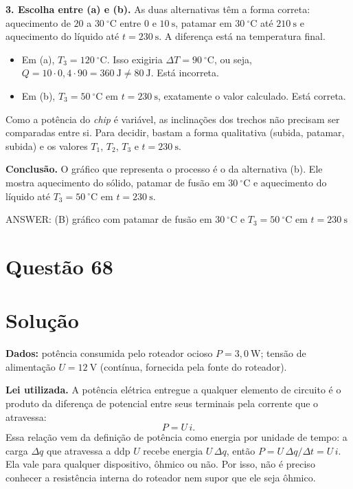 \documentclass{article}%
\begin{document}
\textbf{3. Escolha entre (a) e (b).} As duas alternativas têm a forma correta: aquecimento de $20$ a $30\ ^\circ\mathrm{C}$ entre $0$ e $10\ \mathrm{s}$, patamar em $30\ ^\circ\mathrm{C}$ até $210\ \mathrm{s}$ e aquecimento do líquido até $t = 230\ \mathrm{s}$. A diferença está na temperatura final.
\begin{itemize}
\item Em (a), $T_3 = 120\ ^\circ\mathrm{C}$. Isso exigiria $\Delta T = 90\ ^\circ\mathrm{C}$, ou seja, $Q = 10\cdot 0{,}4\cdot 90 = 360\ \mathrm{J} \neq 80\ \mathrm{J}$. Está incorreta.
\item Em (b), $T_3 = 50\ ^\circ\mathrm{C}$ em $t = 230\ \mathrm{s}$, exatamente o valor calculado. Está correta.
\end{itemize}
Como a potência do \emph{chip} é variável, as inclinações dos trechos não precisam ser comparadas entre si. Para decidir, bastam a forma qualitativa (subida, patamar, subida) e os valores $T_1$, $T_2$, $T_3$ e $t = 230\ \mathrm{s}$.

\textbf{Conclusão.} O gráfico que representa o processo é o da alternativa (b). Ele mostra aquecimento do sólido, patamar de fusão em $30\ ^\circ\mathrm{C}$ e aquecimento do líquido até $T_3 = 50\ ^\circ\mathrm{C}$ em $t = 230\ \mathrm{s}$.

ANSWER: (B) gráfico com patamar de fusão em $30\ ^\circ\mathrm{C}$ e $T_3 = 50\ ^\circ\mathrm{C}$ em $t = 230\ \mathrm{s}$%
\newpage%
\section*{Questão 68}

\section*{Solução}

\textbf{Dados:} potência consumida pelo roteador ocioso $P = 3{,}0\ \text{W}$; tensão de alimentação $U = 12\ \text{V}$ (contínua, fornecida pela fonte do roteador).

\textbf{Lei utilizada.} A potência elétrica entregue a qualquer elemento de circuito é o produto da diferença de potencial entre seus terminais pela corrente que o atravessa:
\[
P = U\,i .
\]
Essa relação vem da definição de potência como energia por unidade de tempo: a carga $\Delta q$ que atravessa a ddp $U$ recebe energia $U\,\Delta q$, então $P = U\,\Delta q/\Delta t = U\,i$. Ela vale para qualquer dispositivo, ôhmico ou não. Por isso, não é preciso conhecer a resistência interna do roteador nem supor que ele seja ôhmico.
\end{document}
